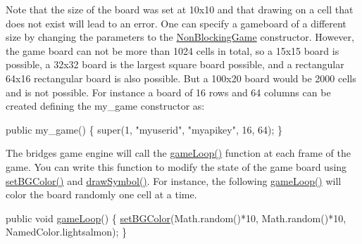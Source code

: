 Note that the size of the board was set at 10x10 and that drawing on a cell that does not exist will lead to an error. One can specify a gameboard of a different size by changing the parameters to the \hyperlink{classbridges_1_1games_1_1_non_blocking_game}{Non\+Blocking\+Game} constructor. However, the game board can not be more than 1024 cells in total, so a 15x15 board is possible, a 32x32 board is the largest square board possible, and a rectangular 64x16 rectangular board is also possible. But a 100x20 board would be 2000 cells and is not possible. For instance a board of 16 rows and 64 columns can be created defining the my\+\_\+game constructor as\+:


\begin{DoxyCode}
\textcolor{keyword}{public} my\_game() \{ super(1, \textcolor{stringliteral}{"myuserid"},  \textcolor{stringliteral}{"myapikey"}, 16, 64); \}
\end{DoxyCode}


The bridges game engine will call the \hyperlink{classbridges_1_1games_1_1_game_base_a56d05ed744791cfc1c3792f39ff438f1}{game\+Loop()} function at each frame of the game. You can write this function to modify the state of the game board using \hyperlink{classbridges_1_1games_1_1_game_base_a7b4d08cdb306a5bf7104ab5315acb414}{set\+B\+G\+Color()} and \hyperlink{classbridges_1_1games_1_1_game_base_a03e8446feb00d5957a7e160a4fa76342}{draw\+Symbol()}. For instance, the following \hyperlink{classbridges_1_1games_1_1_game_base_a56d05ed744791cfc1c3792f39ff438f1}{game\+Loop()} will color the board randomly one cell at a time.


\begin{DoxyCode}
\textcolor{keyword}{public} \textcolor{keywordtype}{void} \hyperlink{classbridges_1_1games_1_1_game_base_a56d05ed744791cfc1c3792f39ff438f1}{gameLoop}() \{
  \hyperlink{classbridges_1_1games_1_1_game_base_a7b4d08cdb306a5bf7104ab5315acb414}{setBGColor}(Math.random()*10, Math.random()*10, NamedColor.lightsalmon);
\}
\end{DoxyCode}


